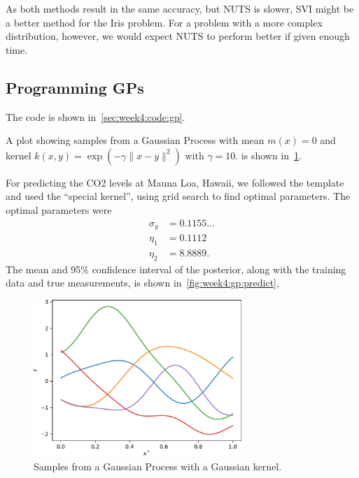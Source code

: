 As both methods result in the same accuracy,
but NUTS is slower, SVI might be a better method
for the Iris problem.
For a problem with a more complex distribution, however,
we would expect NUTS to perform better if given enough time.

\subsection{Programming GPs}

The code is shown in~\cref{sec:week4:code:gp}.

A plot showing samples from a Gaussian Process
with mean $m(x) = 0$ and kernel
$k(x, y) = \exp{\left( -\gamma \parallel x - y \parallel^2 \right)}$
with $\gamma = 10$.
is shown in~\cref{fig:week4:gp:gp-samples}.

For predicting the CO2 levels at Mauna Loa, Hawaii,
we followed the template and used the ``special kernel'',
using grid search to find optimal parameters.
The optimal parameters were
\begin{align*}
  \sigma_y &= 0.1155\ldots \\
  \eta_1 &= 0.1112 \\
  \eta_2 &= 8.8889.
\end{align*}
The mean and 95\% confidence interval of the posterior,
along with the training data and true measurements,
is shown in~\cref{fig:week4:gp:predict},

\begin{figure}[htbp]
  \centering
  \includegraphics[width=0.7\textwidth]{./figures/gp_samples.pdf}
  \caption{Samples from a Gaussian Process with a Gaussian kernel.}
  \label{fig:week4:gp:gp-samples}
\end{figure}

